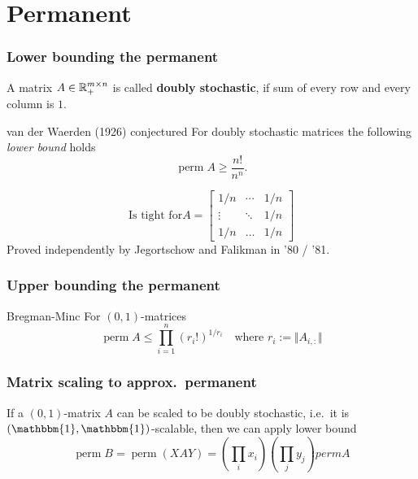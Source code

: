 \documentclass{beamer}
\DeclareMathOperator*{\perm}{perm}
\begin{document}
\section{Permanent}%
\label{sec:}

\begin{frame}
  \frametitle{Lower bounding the permanent}
  \begin{definition}
    A matrix $A \in \mathbb{R}^{m\times n}_+$ is called \textbf{doubly stochastic}, if sum of every row and every column is $1$.
  \end{definition}

  \begin{block}{van der Waerden (1926) conjectured}
    For doubly stochastic matrices the following \emph{lower bound} holds
    \begin{equation}
      \perm A \ge \frac{n!}{n^n}.
    \end{equation}
  \end{block}
  \begin{equation}
   \text{Is tight for} A = \begin{bmatrix}
      1/n & \cdots & 1/n \\
      \vdots & \ddots & 1/n \\
      1/n & \dots & 1/n
    \end{bmatrix}
  \end{equation}
  Proved independently by Jegortschow and Falikman in '80 / '81.
\end{frame}


\begin{frame}
  \frametitle{Upper bounding the permanent}
  \begin{block}{Bregman-Minc}
    For $(0,1)$-matrices
    \begin{equation}
      \perm A \le \prod_{i=1}^n {(r_i !)}^{1/r_i} \quad \text{where $r_i := \Vert A_{i,:} \Vert$}
    \end{equation}
  \end{block}
\end{frame}

\begin{frame}
  \frametitle{Matrix scaling to approx.\ permanent}
  \begin{block}{}
    If a $(0, 1)$-matrix $A$ can be scaled to be doubly stochastic, i.e.\ it is $\left(\mathbbm{1}, \mathbbm{1}\right)$-scalable, then
    we can apply lower bound
    \begin{equation}
      \perm B = \perm (XAY) = \left(\prod_i x_i\right) \left(\prod_j y_j\right) perm A
    \end{equation}
  \end{block}
\end{frame}
\end{document}
